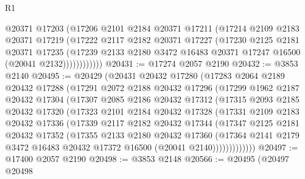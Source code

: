 \begin{lexlean}{R1}
\begin{coremodule}
                @20371
                @17203
                (@17206
                  @2101
                  @2184
                  @20371
                  @17211
                  (@17214
                    @2109
                    @2183
                    @20371
                    @17219
                    (@17222
                      @2117
                      @2182
                      @20371
                      @17227
                      (@17230
                        @2125
                        @2181
                        @20371
                        @17235
                        (@17239
                          @2133
                          @2180
                          @3472
                          @16483
                          @20371
                          @17247
                          @16500
                          (@20041 @2132))))))))))))
@20431 := @17274 @2057 @2190
@20432 := @3853 @2140
@20495 := @20429
    (@20431
      @20432
      @17280
      (@17283
        @2064
        @2189
        @20432
        @17288
        (@17291
          @2072
          @2188
          @20432
          @17296
          (@17299
            @1962
            @2187
            @20432
            @17304
            (@17307
              @2085
              @2186
              @20432
              @17312
              (@17315
                @2093
                @2185
                @20432
                @17320
                (@17323
                  @2101
                  @2184
                  @20432
                  @17328
                  (@17331
                    @2109
                    @2183
                    @20432
                    @17336
                    (@17339
                      @2117
                      @2182
                      @20432
                      @17344
                      (@17347
                        @2125
                        @2181
                        @20432
                        @17352
                        (@17355
                          @2133
                          @2180
                          @20432
                          @17360
                          (@17364
                            @2141
                            @2179
                            @3472
                            @16483
                            @20432
                            @17372
                            @16500
                            (@20041 @2140)))))))))))))
@20497 := @17400 @2057 @2190
@20498 := @3853 @2148
@20566 := @20495
    (@20497
      @20498

\end{coremodule}
\end{lexlean}
